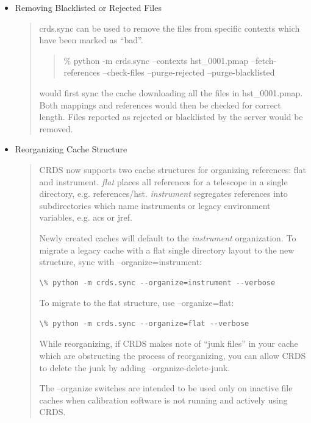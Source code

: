 \documentclass[letterpaper,10pt,english]{sphinxmanual}
\begin{document}
\begin{itemize}
\item {} 
Removing Blacklisted or Rejected Files
\begin{quote}

crds.sync can be used to remove the files from specific contexts which have been marked as ``bad''.
\begin{quote}

\% python -m crds.sync --contexts hst\_0001.pmap --fetch-references --check-files --purge-rejected --purge-blacklisted
\end{quote}

would first sync the cache downloading all the files in hst\_0001.pmap.  Both mappings and references would then
be checked for correct length.   Files reported as rejected or blacklisted by the server would be removed.
\end{quote}

\item {} 
Reorganizing Cache Structure
\begin{quote}

CRDS now supports two cache structures for organizing references: flat and instrument.  \emph{flat} places all references
for a telescope in a single directory,  e.g. references/hst.   \emph{instrument} segregates references into subdirectories
which name instruments or legacy environment variables,  e.g. acs or jref.

Newly created caches will default to the \emph{instrument} organization.  To migrate a legacy cache with a flat single
directory layout to the new structure,  sync with --organize=instrument:

\begin{Verbatim}[commandchars=\\\{\}]
\% python -m crds.sync --organize=instrument --verbose
\end{Verbatim}

To migrate to the flat structure,  use --organize=flat:

\begin{Verbatim}[commandchars=\\\{\}]
\% python -m crds.sync --organize=flat --verbose
\end{Verbatim}

While reorganizing, if CRDS makes note of ``junk files'' in your cache which are
obstructing the process of reorganizing, you can allow CRDS to delete the junk
by adding --organize-delete-junk.

The --organize switches are intended to be used only on inactive file caches
when calibration software is not running and actively using CRDS.
\end{quote}

\end{itemize}
\end{document}
